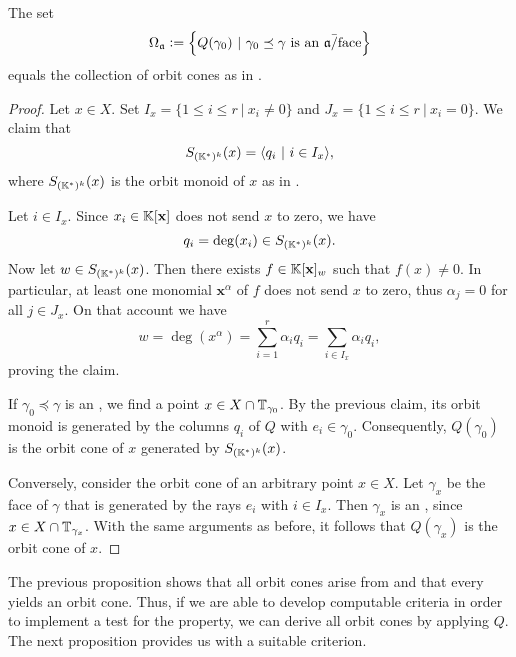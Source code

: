 \begin{prop}
	\label{prop:aface_orbit_cone_correspondence}
	The set
	$$\Omega_\ideal \defeq \left\{Q(\gamma_0)\ |\ \gamma_0\preceq\gamma \text{ is an } \ideal\text{\=/face}\right\}$$
	equals the collection of orbit cones as in .
\end{prop}
\begin{proof}
	Let $x\in X$. Set $I_x = \{1 \leq i \leq r\ |\ x_i \neq 0\}$ and $J_x = \{1 \leq i \leq r\ |\ x_i = 0\}$. We claim that
	$$S_{(\mathbb{K}^*)^k}(x) = \langle q_i\ |\ i\in I_x\rangle,$$
	where $S_{(\mathbb{K}^*)^k}(x)$ is the orbit monoid of $x$ as in .
	
	Let $i\in I_x$. Since $x_i\in\mathbb{K}[\mathbf{x}]$ does not send $x$ to zero, we have
	$$q_i = \deg(x_i)\in S_{(\mathbb{K}^*)^k}(x).$$
	Now let $w\in S_{(\mathbb{K}^*)^k}(x)$. Then there exists $f\in\mathbb{K}[\mathbf{x}]_w$ such that $f(x) \neq 0$. In particular, at least one monomial $\mathbf{x}^\alpha$ of $f$ does not send $x$ to zero, thus $\alpha_j = 0$ for all $j\in J_x$. On that account we have
	$$w = \deg(x^\alpha) = \sum_{i=1}^r \alpha_i q_i = \sum_{i\in I_x} \alpha_i q_i,$$
	proving the claim.
	
	If $\gamma_0\preceq\gamma$ is an \aface{}, we find a point $x\in X\cap \mathbb{T}_{\gamma_0}$. By the previous claim, its orbit monoid is generated by the columns $q_i$ of $Q$ with $e_i\in\gamma_0$. Consequently, $Q(\gamma_0)$ is the orbit cone of $x$ generated by $S_{(\mathbb{K}^*)^k}(x)$.
	
	Conversely, consider the orbit cone of an arbitrary point $x\in X$. Let $\gamma_x$ be the face of $\gamma$ that is generated by the rays $e_i$ with $i\in I_x$. Then $\gamma_x$ is an \aface{}, since $x\in X\cap \mathbb{T}_{\gamma_x}$. With the same arguments as before, it follows that $Q(\gamma_x)$ is the orbit cone of $x$.
\end{proof}

The previous proposition shows that all orbit cones arise from \afaces{} and that every \aface{} yields an orbit cone. Thus, if we are able to develop computable criteria in order to implement a test for the \aface{} property, we can derive all orbit cones by applying $Q$. The next proposition provides us with a suitable criterion.

